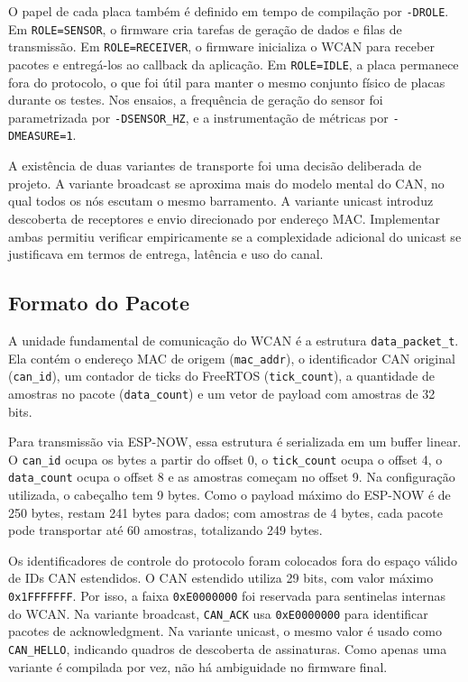 \documentclass{article}
\begin{document}
    O papel de cada placa também é definido em tempo de compilação por \texttt{-DROLE}. Em \texttt{ROLE=SENSOR}, o firmware cria tarefas de geração de dados e filas de transmissão. Em \texttt{ROLE=RECEIVER}, o firmware inicializa o WCAN para receber pacotes e entregá-los ao callback da aplicação. Em \texttt{ROLE=IDLE}, a placa permanece fora do protocolo, o que foi útil para manter o mesmo conjunto físico de placas durante os testes. Nos ensaios, a frequência de geração do sensor foi parametrizada por \texttt{-DSENSOR_HZ}, e a instrumentação de métricas por \texttt{-DMEASURE=1}.

    A existência de duas variantes de transporte foi uma decisão deliberada de projeto. A variante broadcast se aproxima mais do modelo mental do CAN, no qual todos os nós escutam o mesmo barramento. A variante unicast introduz descoberta de receptores e envio direcionado por endereço MAC. Implementar ambas permitiu verificar empiricamente se a complexidade adicional do unicast se justificava em termos de entrega, latência e uso do canal.

    \subsection{Formato do Pacote}

    A unidade fundamental de comunicação do WCAN é a estrutura \texttt{data_packet_t}. Ela contém o endereço MAC de origem (\texttt{mac_addr}), o identificador CAN original (\texttt{can_id}), um contador de ticks do FreeRTOS (\texttt{tick_count}), a quantidade de amostras no pacote (\texttt{data_count}) e um vetor de payload com amostras de 32 bits.

    Para transmissão via ESP-NOW, essa estrutura é serializada em um buffer linear. O \texttt{can_id} ocupa os bytes a partir do offset 0, o \texttt{tick_count} ocupa o offset 4, o \texttt{data_count} ocupa o offset 8 e as amostras começam no offset 9. Na configuração utilizada, o cabeçalho tem 9 bytes. Como o payload máximo do ESP-NOW é de 250 bytes, restam 241 bytes para dados; com amostras de 4 bytes, cada pacote pode transportar até 60 amostras, totalizando 249 bytes.

    Os identificadores de controle do protocolo foram colocados fora do espaço válido de IDs CAN estendidos. O CAN estendido utiliza 29 bits, com valor máximo \texttt{0x1FFFFFFF}. Por isso, a faixa \texttt{0xE0000000} foi reservada para sentinelas internas do WCAN. Na variante broadcast, \texttt{CAN_ACK} usa \texttt{0xE0000000} para identificar pacotes de acknowledgment. Na variante unicast, o mesmo valor é usado como \texttt{CAN_HELLO}, indicando quadros de descoberta de assinaturas. Como apenas uma variante é compilada por vez, não há ambiguidade no firmware final.
\end{document}
